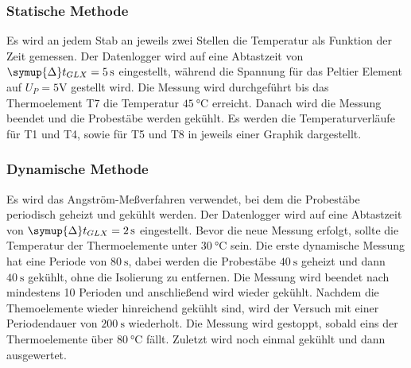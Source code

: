 \subsubsection{Statische Methode}
Es wird an jedem Stab an jeweils zwei Stellen die Temperatur als Funktion der Zeit gemessen. 
Der Datenlogger wird auf eine Abtastzeit von $\symup{\Delta} t_{GLX}=\SI{5}{\second}$ eingestellt, während die Spannung für das Peltier Element auf $U_P=5\si{\volt}$ gestellt wird.
Die Messung wird durchgeführt bis das Thermoelement T7 die Temperatur $\SI{45}{\celsius}$ erreicht. Danach wird die Messung beendet und die Probestäbe werden gekühlt.
Es werden die Temperaturverläufe für T1 und T4, sowie für T5 und T8 in jeweils einer Graphik dargestellt.
\subsubsection{Dynamische Methode}
Es wird das Angström-Meßverfahren verwendet, bei dem die Probestäbe periodisch geheizt und gekühlt werden.
Der Datenlogger wird auf eine Abtastzeit von $\symup{\Delta}t_{GLX}=\SI{2}{\second}$ eingestellt.
Bevor die neue Messung erfolgt, sollte die Temperatur der Thermoelemente unter $\SI{30}{\celsius}$ sein.
Die erste dynamische Messung hat eine Periode von $\SI{80}{\second}$, dabei werden die Probestäbe $\SI{40}{\second}$ geheizt und dann $\SI{40}{\second}$ gekühlt, ohne die Isolierung zu entfernen.
Die Messung wird beendet nach mindestens 10 Perioden und anschließend wird wieder gekühlt.
Nachdem die Themoelemente wieder hinreichend gekühlt sind, wird der Versuch mit einer Periodendauer von $\SI{200}{\second}$ wiederholt.
Die Messung wird gestoppt, sobald eins der Thermoelemente über $\SI{80}{\celsius}$ fällt.
Zuletzt wird noch einmal gekühlt und dann ausgewertet.